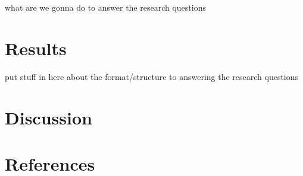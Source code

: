 \documentclass[
  english,
  man]{apa6}
\newlength{\cslhangindent}
\newlength{\cslentryspacingunit} %
\newenvironment{CSLReferences}[2] %
 {%
  \setlength{\parindent}{0pt}
  \ifodd #1
  \let\oldpar\par
  \def\par{\hangindent=\cslhangindent\oldpar}
  \fi
  \setlength{\parskip}{#2\cslentryspacingunit}
 }%
 {}
\begin{document}
what are we gonna do to answer the research questions

\hypertarget{results}{%
\section{Results}\label{results}}

put stuff in here about the format/structure to answering the research questions

\hypertarget{discussion}{%
\section{Discussion}\label{discussion}}

\newpage

\hypertarget{references}{%
\section{References}\label{references}}

\begingroup
\setlength{\parindent}{-0.5in}
\setlength{\leftskip}{0.5in}

\hypertarget{refs}{}
\begin{CSLReferences}{0}{0}
\end{CSLReferences}

\endgroup
\end{document}
